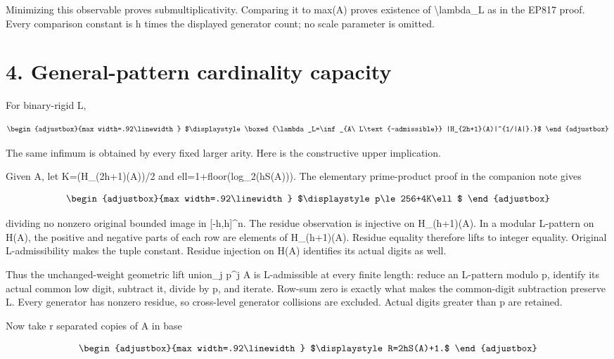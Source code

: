 Minimizing this observable proves submultiplicativity. Comparing it to max(A) proves existence of \textbackslash lambda\_L as in the EP817 proof. Every comparison constant is h times the displayed generator count; no scale parameter is omitted.

\section{4. General-pattern cardinality capacity}\label{n23-general-pattern-cardinality-capacity}

For binary-rigid L,

\[
\begin{adjustbox}{max width=.92\linewidth}
$\displaystyle \boxed{\lambda_L=\inf_{A\ L\text{-admissible}}
|H_{2h+1}(A)|^{1/|A|}.}$
\end{adjustbox}
\]

The same infimum is obtained by every fixed larger arity. Here is the constructive upper implication.

Given A, let K=(\textbar H\_(2h+1)(A))/2 and ell=1+floor(log\_2(hS(A))). The elementary prime-product proof in the companion note gives

\[
\begin{adjustbox}{max width=.92\linewidth}
$\displaystyle p\le256+4K\ell$
\end{adjustbox}
\]

dividing no nonzero original bounded image in {[}-h,h{]}\^{}n. The residue observation is injective on H\_(h+1)(A). In a modular L-pattern on H(A), the positive and negative parts of each row are elements of H\_(h+1)(A). Residue equality therefore lifts to integer equality. Original L-admissibility makes the tuple constant. Residue injection on H(A) identifies its actual digits as well.

Thus the unchanged-weight geometric lift union\_j p\^{}j A is L-admissible at every finite length: reduce an L-pattern modulo p, identify its actual common low digit, subtract it, divide by p, and iterate. Row-sum zero is exactly what makes the common-digit subtraction preserve L. Every generator has nonzero residue, so cross-level generator collisions are excluded. Actual digits greater than p are retained.

Now take r separated copies of A in base

\[
\begin{adjustbox}{max width=.92\linewidth}
$\displaystyle R=2hS(A)+1.$
\end{adjustbox}
\]

